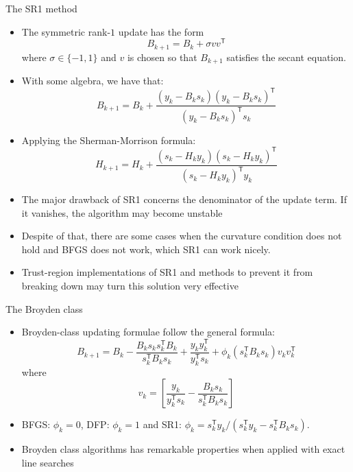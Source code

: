 \documentclass{beamer}
\newcommand{\tran}{\mathsf{T}}
\begin{document}
\begin{frame}[allowframebreaks]{The SR1 method}
	\begin{itemize}
		\item The symmetric rank-$1$ update has the form
		\[
			B_{k+1} = B_k + \sigma v v^\tran
		\]
		where $\sigma \in \{-1,1\}$ and $v$ is chosen so that $B_{k+1}$ satisfies the secant equation.
		\item With some algebra, we have that:
		\[
			B_{k+1} = B_k + \frac{(y_k-B_ks_k)(y_k - B_k s_k)^\tran}{(y_k - B_k s_k)^\tran s_k}
		\]
		\item Applying the Sherman-Morrison formula:
		\[
			H_{k+1} = H_k + \frac{(s_k-H_ky_k)(s_k - H_k y_k)^\tran}{(s_k - H_k y_k)^\tran y_k}		
		\]
		\item The major drawback of SR1 concerns the denominator of the update term. If it vanishes, the algorithm may become unstable
		\item Despite of that, there are some cases when the curvature condition does not hold and BFGS does not work, which SR1 can work nicely.
		\item Trust-region implementations of SR1 and methods to prevent it from breaking down may turn this solution very effective
	\end{itemize}
\end{frame}

\begin{frame}[allowframebreaks]{The Broyden class}
	\begin{itemize}
		\item Broyden-class updating formulae follow the general formula:
		\[
			B_{k+1} = B_k - \frac{B_k s_k s_k^\tran B_k}{s_k^\tran B_k s_k} + \frac{y_k y_k^\tran}{y_k^\tran s_k} + \phi_k (s_k^\tran B_k s_k) v_k v_k^\tran
		\]
		where
		\[
			v_k = \left[ \frac{y_k}{y_k^\tran s_k} - \frac{B_k s_k}{s_k^\tran B_k s_k}\right]
		\]
		\item BFGS: $\phi_k = 0$, DFP: $\phi_k = 1$ and SR1: $\phi_k = s_k^\tran y_k /(s_k^\tran y_k - s_k^\tran B_k s_k)$.
		
		\item Broyden class algorithms has remarkable properties when applied with exact line searches
	\end{itemize}
\end{frame}
\end{document}
